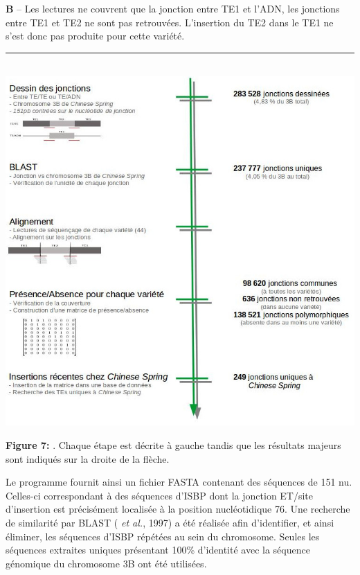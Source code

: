 \documentclass[a4paper, 12pt]{article}
\begin{document}
\begin{onehalfspace}
\begin{multicols}{2}
\textbf{B} – Les lectures ne couvrent que la jonction entre TE1 et l'ADN, les jonctions entre TE1 et TE2 ne sont pas retrouvées. L'insertion du TE2 dans le TE1 ne s'est donc pas produite pour cette variété.\\
\end{multicols}
\begin{center}
\rule{10cm}{0.2pt}\\
\vspace{0.5cm}
\includegraphics[scale=0.5]{pic_Data/fig6.jpg}\\
\end{center}
\vspace{-0.5cm}
\textbf{Figure 7:} . Chaque étape est décrite à gauche tandis que les résultats majeurs sont indiqués sur la droite de la flèche.\\
\vfill
\addtocounter{page}{-1}
\newpage

Le programme fournit ainsi un fichier FASTA contenant des séquences de 151 nu. Celles-ci correspondant à des séquences d'ISBP dont la jonction ET/site d'insertion est précisément localisée à la position nucléotidique 76. Une recherche de similarité par BLAST ( \textit{et al.}, 1997) a été réalisée afin d'identifier, et ainsi éliminer, les séquences d'ISBP répétées au sein du chromosome. Seules les séquences extraites uniques présentant 100\% d'identité avec la séquence génomique du chromosome 3B ont été utilisées.\\


\end{onehalfspace}
\end{document}
